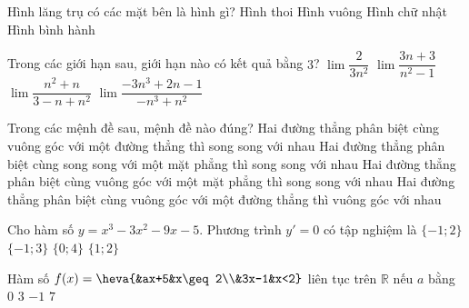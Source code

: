 \begin{ex}%
Hình lăng trụ có các mặt bên là hình gì?
\choice
{Hình thoi}
{Hình vuông}
{Hình chữ nhật}
{\True Hình bình hành}
\end{ex}

\begin{ex}%
Trong các giới hạn sau, giới hạn nào có kết quả bằng $3$?
\choice
{$\lim\dfrac{2}{3n^2}$}
{$\lim\dfrac{3n+3}{n^2-1}$}
{$\lim\dfrac{n^2+n}{3-n+n^2}$}
{\True $\lim\dfrac{-3n^3+2n-1}{-n^3+n^2}$}
\end{ex}

\begin{ex}%
Trong các mệnh đề sau, mệnh đề nào đúng?
\choice
{Hai đường thẳng phân biệt cùng vuông góc với một đường thẳng thì song song với nhau}
{Hai đường thẳng phân biệt cùng song song với một mặt phẳng thì song song với nhau}
{\True Hai đường thẳng phân biệt cùng vuông góc với một mặt phẳng thì song song với nhau}
{Hai đường thẳng phân biệt cùng vuông góc với một đường thẳng thì vuông góc với nhau}
\end{ex}

\begin{ex}%
Cho hàm số $y=x^3-3x^2-9x-5$. Phương trình $y'=0$ có tập nghiệm là
\choice
{$\{-1;2\}$}
{\True $\{-1;3\}$}
{$\{0;4\}$}
{$\{1;2\}$}
\end{ex}

\begin{ex}%
Hàm số $f(x)=\heva{&ax+5&x\geq 2\\&3x-1&x<2}$ liên tục trên $\mathbb{R}$ nếu $a$ bằng
\choice
{\True $0$}
{$3$}
{$-1$}
{$7$}
\end{ex}

